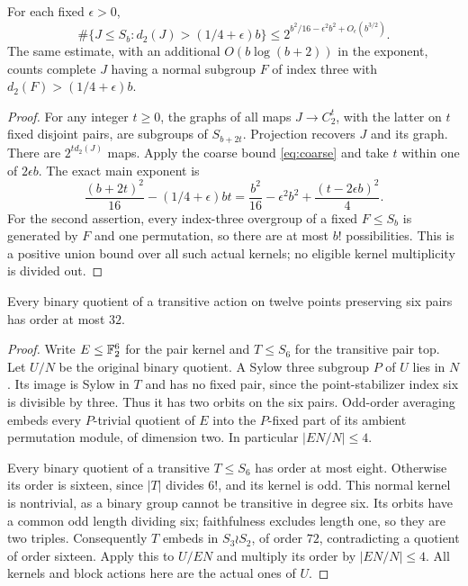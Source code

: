 \begin{lemma}
\label{lem:complete-binary-rank-tail}
For each fixed $\epsilon>0$,
\[
 \#\{J\leq S_b:d_2(J)>(1/4+\epsilon)b\}
 \leq2^{b^2/16-\epsilon^2b^2+O_\epsilon(b^{3/2})}.
\]
The same estimate, with an additional $O(b\log(b+2))$ in the
exponent, counts complete $J$ having a normal subgroup $F$ of index
three with $d_2(F)>(1/4+\epsilon)b$.
\end{lemma}
\begin{proof}
For any integer $t\geq0$, the graphs of all maps
$J\to C_2^t$, with the latter on $t$ fixed disjoint pairs, are
subgroups of $S_{b+2t}$. Projection recovers $J$ and its graph.
There are $2^{td_2(J)}$ maps. Apply the coarse bound
\eqref{eq:coarse} and take $t$ within one of $2\epsilon b$.
The exact main exponent is
\[
 \frac{(b+2t)^2}{16}-(1/4+\epsilon)bt
 =\frac{b^2}{16}-\epsilon^2b^2
                       +\frac{(t-2\epsilon b)^2}{4}.
\]
For the second assertion, every index-three overgroup of a fixed
$F\leq S_b$ is generated by $F$ and one permutation, so there are
at most $b!$ possibilities. This is a positive union bound over
all such actual kernels; no eligible kernel multiplicity is divided out.
\end{proof}

\begin{lemma}
\label{lem:six-pair-binary-quotient}
Every binary quotient of a transitive action on twelve points
preserving six pairs has order at most $32$.
\end{lemma}
\begin{proof}
Write $E\leq\mathbb F_2^6$ for the pair kernel and $T\leq S_6$ for the
transitive pair top. Let $U/N$ be the original binary quotient.
A Sylow three subgroup $P$ of $U$ lies in $N$. Its image is Sylow
in $T$ and has no fixed pair, since the point-stabilizer index six
is divisible by three. Thus it has two orbits on the six pairs.
Odd-order averaging embeds every $P$-trivial quotient of $E$ into
the $P$-fixed part of its ambient permutation module, of dimension
two. In particular $|EN/N|\leq4$.

Every binary quotient of a transitive $T\leq S_6$ has order at
most eight. Otherwise its order is sixteen, since $|T|$ divides
$6!$, and its kernel is odd. This normal kernel is nontrivial,
as a binary group cannot be transitive in degree six. Its orbits
have a common odd length dividing six; faithfulness excludes
length one, so they are two triples. Consequently $T$ embeds
in $S_3\wr S_2$, of order $72$, contradicting a quotient of
order sixteen. Apply this to $U/EN$ and multiply its order by
$|EN/N|\leq4$. All kernels and block actions here are the actual
ones of $U$.
\end{proof}

